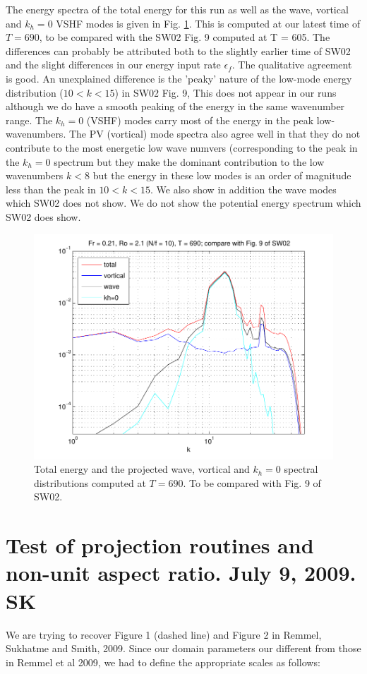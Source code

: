 \documentclass[12pt]{article}
\begin{document}
The energy spectra of the total energy for this run as well as the
wave, vortical and $k_h=0$ VSHF modes is given in Fig.
\ref{NF10_spec}. This is computed at our latest time of $T=690$, to be
compared with the SW02 Fig. 9 computed at T = 605. The differences can
probably be attributed both to the slightly earlier time of SW02 and
the slight differences in our energy input rate $\epsilon_f$. The
qualitative agreement is good. An unexplained difference is the
'peaky' nature of the low-mode energy distribution ($10< k < 15$) in
SW02 Fig. 9, This does not appear in our runs although we do have a
smooth peaking of the energy in the same wavenumber range.  The $k_h =
0$ (VSHF) modes carry most of the energy in the peak low-wavenumbers.
The PV (vortical) mode spectra also agree well in that they do not
contribute to the most energetic low wave numvers (corresponding to
the peak in the $k_h=0$ spectrum but they make the dominant
contribution to the low wavenumbers $k < 8$ but the energy in these
low modes is an order of magnitude less than the peak in $10< k <15$.
We also show in addition the wave modes which SW02 does not show. We
do not show the potential energy spectrum which SW02 does show.
\begin{figure}[ht]
\centering 
 \includegraphics[scale = 0.7]{Comp_SW02_fig9}
 \caption{Total energy and the projected wave, vortical and $k_h=0$
   spectral distributions computed at $T= 690$. To be compared with
   Fig. 9 of SW02. \label{NF10_spec}}
\end{figure}

\section{Test of projection routines and non-unit aspect ratio. July 9, 2009. SK}
We are trying to recover Figure 1 (dashed line) and Figure 2 in
Remmel, Sukhatme and Smith, 2009.  Since our domain parameters our
different from those in Remmel et al 2009, we had to define the
appropriate scales as follows:
\end{document}
